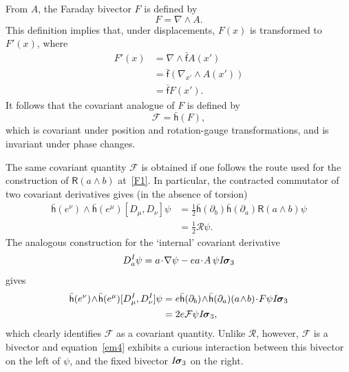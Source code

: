 \documentclass[a4paper]{article}
\numberwithin{equation}{section}
\newcommand{\nn}{\nonumber}
\newcommand{\dt}{\! \cdot \!}
\newcommand{\wdg}{\! \wedge \!}
\newcommand{\half}{{\textstyle \frac{1}{2}}}
\newcommand{\eqv}{=}
\newcommand{\sig}{\mbox{\boldmath $\sigma$}}
\newcommand{\bsig}{\mbox{\boldmath $\sig$}}
\newcommand{\clf}{{\mathcal{F}}}
\newcommand{\clr}{{\mathcal{R}}}
\newcommand{\da}{\partial_a}
\newcommand{\db}{\partial_b}
\newcommand{\isk}{I \hspace{-1pt} \bsig_3}
\newcommand{\lbf}{\bar{\mathsf{f}}}
\newcommand{\lbh}{\bar{\mathsf{h}}}
\newcommand{\liR}{\mathsf{R}}
\newcommand{\ho}{\lbh}
\newcommand{\fo}{\lbf}
\newcommand{\grad}{\nabla}
\begin{document}
From $A$, the Faraday bivector $F$ is defined by
%
\begin{equation}
F \eqv \grad \wdg A.
\end{equation}
%
This definition implies that, under displacements, $F(x)$ is transformed
to $F'(x)$, where
%
\begin{align}
F'(x) &= \grad \wdg \fo A(x') \nn \\
&= \fo(\grad_{x'} \wdg A(x')) \nn \\
&= \fo F(x').
\end{align}
%
It follows that the covariant analogue of $F$ is defined by
%
\begin{equation}
\clf = \ho(F),
\end{equation}
%
which is covariant under position and rotation-gauge transformations,
and is invariant under phase changes.


The same covariant quantity $\clf$ is obtained if one follows the
route used for the construction of $\liR(a\wedge b)$ at~\eqref{F1}.  In
particular, the contracted commutator of two covariant derivatives
gives (in the absence of torsion)
%
\begin{align}
\ho(e^\nu) \wdg \ho(e^\mu) [D_\mu, D_\nu] \psi 
&= \half \ho(\db)\ho(\da) \liR(a \wdg b) \psi \nn \\
&= \half \clr \psi.
\end{align}
%
The analogous construction for the `internal' covariant derivative
%
\begin{equation}
D_a^I \psi = a \dt \grad \psi - e a \dt A \, \psi \isk
\end{equation}
%
gives
%
\begin{align}
\ho(e^\nu) \wdg \ho(e^\mu) [D_\mu^I, D_\nu^I] \psi 
&= e \ho(\db) \wdg \ho(\da) (a\wdg b) \dt F \psi \isk \nn \\
&= 2 e \clf \psi \isk,
\label{em4}
\end{align}
%
which clearly identifies $\clf$ as a covariant quantity.  Unlike
$\clr$, however, $\clf$ is a bivector and equation~\eqref{em4} exhibits a
curious interaction between this bivector on the left of $\psi$, and
the fixed bivector $\isk$ on the right.  
\end{document}
